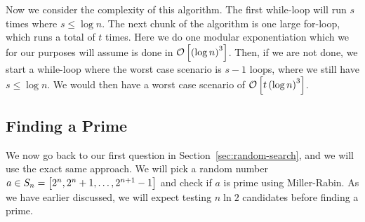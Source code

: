  Now we consider the complexity of this algorithm.
  The first while-loop will run $s$ times where $s \leq \log n$.
  The next chunk of the algorithm is one large for-loop, which runs a total of $t$ times.
  Here we do one modular exponentiation which we for our purposes will assume is done in $\mathcal{O} \left[  \left(  \log n  \right)^3 \right]$.
  Then, if we are not done, we start a while-loop where the worst case scenario is $s-1$ loops, where we still have $s \leq \log n$.
  We would then have a worst case scenario of $\mathcal{O} \left[  t \left(  \log n  \right)^3  \right]$.


\subsection{Finding a Prime}
  We now go back to our first question in Section~\ref{sec:random-search}, and we will use the exact same approach.
  We will pick a random number $a \in S_n = \left[  2^n, 2^n + 1, \dots, 2^{n+1}-1  \right]$ and check if $a$ is prime using Miller-Rabin.
  As we have earlier discussed, we will expect testing $n \ln 2$ candidates before finding a prime.
  
